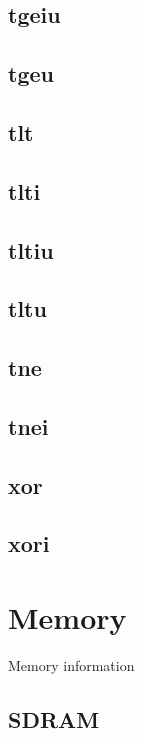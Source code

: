 \documentclass{article}
\begin{document}
\subsection*{tgeiu}

\subsection*{tgeu}

\subsection*{tlt}

\subsection*{tlti}

\subsection*{tltiu}

\subsection*{tltu}

\subsection*{tne}

\subsection*{tnei}

\subsection*{xor}

\subsection*{xori}



\section{Memory}
Memory information

\subsection{SDRAM}
\end{document}
